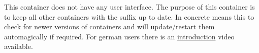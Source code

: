 This container does not have any user interface. The purpose of this container
is to keep all other containers with the  suffix up
to date. In concrete means this to check for newer versions of containers and
will update/restart them automagically if required. For german users there is
an \href{https://www.youtube.com/watch?v=TFS-s5Aq028}{introduction} video
available.

